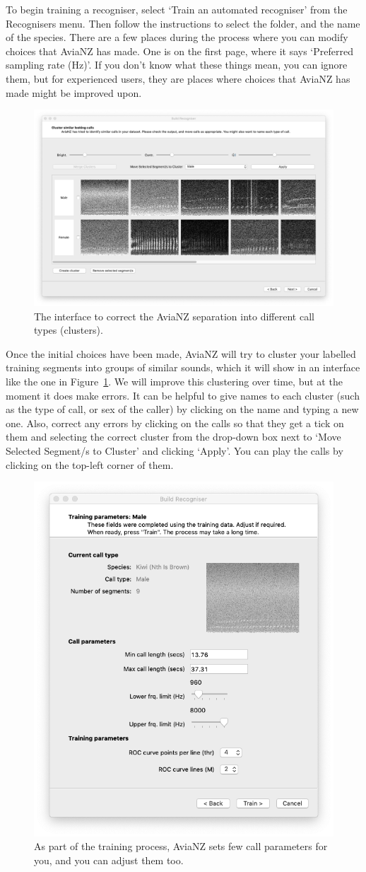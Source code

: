\documentclass{article}
\begin{document}
To begin training a recogniser, select `Train an automated recogniser' from the Recognisers menu. Then follow the instructions to select the folder, and the name of the species. There are a few places during the process where you can modify choices that AviaNZ has made. One is on the first page, where it says `Preferred sampling rate (Hz)'. If you don't know what these things mean, you can ignore them, but for experienced users, they are places where choices that AviaNZ has made might be improved upon. 

    \begin{figure}[h]
    \centering
    \includegraphics[width=.6\textwidth]{Figs/Wizard_cluster}
    \caption{The interface to correct the AviaNZ separation into different call types (clusters).}
    \label{fig:clusters}
    \end{figure}
    
Once the initial choices have been made, AviaNZ will try to cluster your labelled training segments into groups of similar sounds, which it will show in an interface like the one in Figure~\ref{fig:clusters}. We will improve this clustering over time, but at the moment it does make errors. It can be helpful to give names to each cluster (such as the type of call, or sex of the caller) by clicking on the name and typing a new one. Also, correct any errors by clicking on the calls so that they get a tick on them and selecting the correct cluster from the drop-down box next to `Move Selected Segment/s to Cluster' and clicking `Apply'. You can play the calls by clicking on the top-left corner of them.

       \begin{figure}[h]
    \centering
    \includegraphics[width=.4\textwidth]{Figs/Wizard_params}
    \caption{As part of the training process, AviaNZ sets few call parameters for you, and you can adjust them too.}
    \label{fig:filterparams}
    \end{figure}
\end{document}
